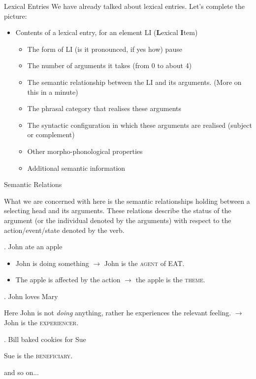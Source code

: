 \begin{frame}
  {Lexical Entries}
We have already talked about lexical entries.    Let's complete the picture:
\begin{itemize}
\item Contents of a lexical entry, for an element LI (\textbf{L}exical \textbf{I}tem)
  \begin{itemize}
  \item The form of LI (is it pronounced, if yes how) pause
  \item The number of arguments it takes (from 0 to about 4) \pause
  \item The semantic relationship between the LI and its arguments. (More on this in a minute)
  \item The phrasal category that realises these arguments
  \item The syntactic configuration in which these arguments are realised (subject or complement)
  \item Other morpho-phonological properties
  \item Additional semantic information
  \end{itemize}
\end{itemize} 
\end{frame}

\begin{frame}
  {Semantic Relations} 

What we are concerned with here is the semantic relationships holding between a selecting head and its arguments.  These relations describe the status of the argument (or the individual denoted by the arguments) with respect to the action/event/state denoted by the verb.

\ex.
John ate an apple


\begin{itemize}
\item John is doing something $\rightarrow$ John is the \textsc{agent} of EAT.
\item The apple is affected by the action $\rightarrow$ the apple is the \textsc{theme}.
\end{itemize}

\end{frame}

\begin{frame}

\ex.
John loves Mary

Here John is not \textit{doing} anything, rather he experiences the relevant feeling. $\rightarrow$ John is the \textsc{experiencer}.  

\ex.
Bill baked cookies for Sue

Sue is the \textsc{beneficiary}.

and so on...

\end{frame}

